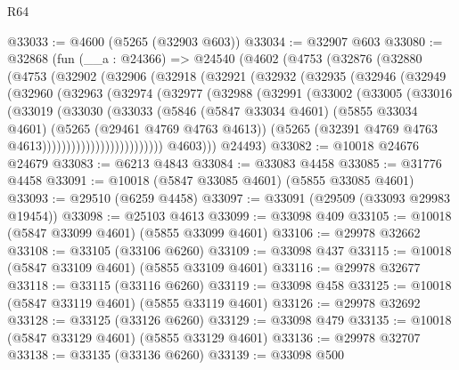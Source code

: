 \begin{lexlean}{R64}
\begin{coremodule}
@33033 := @4600 (@5265 (@32903 @603))
@33034 := @32907 @603
@33080 := @32868
    (fun (__a : @24366) =>
    @24540
      (@4602
        (@4753
          (@32876
            (@32880
              (@4753
                (@32902
                  (@32906
                    (@32918
                      (@32921
                        (@32932
                          (@32935
                            (@32946
                              (@32949
                                (@32960
                                  (@32963
                                    (@32974
                                      (@32977
                                        (@32988
                                          (@32991
                                            (@33002
                                              (@33005
                                                (@33016
                                                  (@33019
                                                    (@33030
                                                      (@33033
                                                        (@5846
                                                          (@5847 @33034 @4601)
                                                          (@5855 @33034 @4601)
                                                          (@5265 (@29461 @4769 @4763 @4613))
                                                          (@5265
                                                            (@32391
                                                              @4769
                                                              @4763
                                                              @4613)))))))))))))))))))))))))
            @4603)))
      @24493)
@33082 := @10018 @24676 @24679
@33083 := @6213 @4843
@33084 := @33083 @4458
@33085 := @31776 @4458
@33091 := @10018 (@5847 @33085 @4601) (@5855 @33085 @4601)
@33093 := @29510 (@6259 @4458)
@33097 := @33091 (@29509 (@33093 @29983 @19454))
@33098 := @25103 @4613
@33099 := @33098 @409
@33105 := @10018 (@5847 @33099 @4601) (@5855 @33099 @4601)
@33106 := @29978 @32662
@33108 := @33105 (@33106 @6260)
@33109 := @33098 @437
@33115 := @10018 (@5847 @33109 @4601) (@5855 @33109 @4601)
@33116 := @29978 @32677
@33118 := @33115 (@33116 @6260)
@33119 := @33098 @458
@33125 := @10018 (@5847 @33119 @4601) (@5855 @33119 @4601)
@33126 := @29978 @32692
@33128 := @33125 (@33126 @6260)
@33129 := @33098 @479
@33135 := @10018 (@5847 @33129 @4601) (@5855 @33129 @4601)
@33136 := @29978 @32707
@33138 := @33135 (@33136 @6260)
@33139 := @33098 @500

\end{coremodule}
\end{lexlean}
